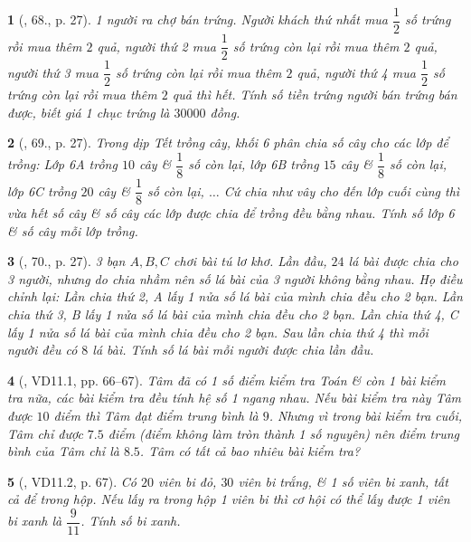 \documentclass{article}
\newtheorem{baitoan}{}
\begin{document}
\begin{baitoan}[\cite{Binh_Toan_6_tap_2}, 68., p. 27]
	1 người ra chợ bán trứng. Người khách thứ nhất mua $\dfrac{1}{2}$ số trứng rồi mua thêm $2$ quả, người thứ 2 mua $\dfrac{1}{2}$ số trứng còn lại rồi mua thêm $2$ quả, người thứ 3 mua $\dfrac{1}{2}$ số trứng còn lại rồi mua thêm $2$ quả, người thứ 4 mua $\dfrac{1}{2}$ số trứng còn lại rồi mua thêm $2$ quả thì hết. Tính số tiền trứng người bán trứng bán được, biết giá 1 chục trứng là $30000$ đồng.
\end{baitoan}

\begin{baitoan}[\cite{Binh_Toan_6_tap_2}, 69., p. 27]
	Trong dịp Tết trồng cây, khối 6 phân chia số cây cho các lớp để trồng: Lớp 6A trồng $10$ cây \& $\dfrac{1}{8}$ số còn lại, lớp 6B trồng $15$ cây \& $\dfrac{1}{8}$ số còn lại, lớp 6C trồng $20$ cây \& $\dfrac{1}{8}$ số còn lại, $\ldots$ Cứ chia như vây cho đến lớp cuối cùng thì vừa hết số cây \& số cây các lớp được chia để trồng đều bằng nhau. Tính số lớp 6 \& số cây mỗi lớp trồng.
\end{baitoan}

\begin{baitoan}[\cite{Binh_Toan_6_tap_2}, 70., p. 27]
	3 bạn $A,B,C$ chơi bài tú lơ khơ. Lần đầu, $24$ lá bài được chia cho 3 người, nhưng do chia nhầm nên số lá bài của 3 người không bằng nhau. Họ điều chỉnh lại: Lần chia thứ 2, A lấy 1 nửa số lá bài của mình chia đều cho 2 bạn. Lần chia thứ 3, B lấy 1 nửa số lá bài của mình chia đều cho 2 bạn. Lần chia thứ 4, C lấy 1 nửa số lá bài của mình chia đều cho 2 bạn. Sau lần chia thứ 4 thì mỗi người đều có $8$ lá bài. Tính số lá bài mỗi người được chia lần đầu.
\end{baitoan}

\begin{baitoan}[\cite{TLCT_THCS_Toan_6_so_hoc}, VD11.1, pp. 66--67]
	Tâm đã có 1 số điểm kiểm tra Toán \& còn 1 bài kiểm tra nữa, các bài kiểm tra đều tính hệ số 1 ngang nhau. Nếu bài kiểm tra này Tâm được $10$ điểm thì Tâm đạt điểm trung bình là $9$. Nhưng vì trong bài kiểm tra cuối, Tâm chỉ được $7.5$ điểm (điểm không làm tròn thành 1 số nguyên) nên điểm trung bình của Tâm chỉ là $8.5$. Tâm có tất cả bao nhiêu bài kiểm tra?
\end{baitoan}

\begin{baitoan}[\cite{TLCT_THCS_Toan_6_so_hoc}, VD11.2, p. 67]
	Có $20$ viên bi đỏ, $30$ viên bi trắng, \& 1 số viên bi xanh, tất cả để trong hộp. Nếu lấy ra trong hộp 1 viên bi thì cơ hội có thể lấy được 1 viên bi xanh là $\dfrac{9}{11}$. Tính số bi xanh.
\end{baitoan}
\end{document}
